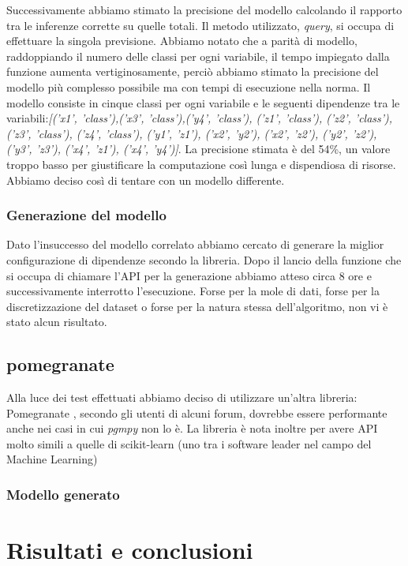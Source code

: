 \documentclass[12pt]{article}
\begin{document}
Successivamente abbiamo stimato la precisione del modello calcolando il rapporto tra le inferenze corrette su quelle totali. Il metodo utilizzato, \emph{query}, si occupa di effettuare la singola previsione. Abbiamo notato che a parità di modello, raddoppiando il numero delle classi per ogni variabile, il tempo impiegato dalla funzione aumenta vertiginosamente, perciò abbiamo stimato la precisione del modello più complesso possibile ma con tempi di esecuzione nella norma. \newline
Il modello consiste in cinque classi per ogni variabile e le seguenti dipendenze tra le variabili:\newline \emph{[('x1', 'class'),('x3', 'class'),('y4', 'class'), ('z1', 'class'), ('z2', 'class'), ('z3', 'class'), ('z4', 'class'), ('y1', 'z1'), ('x2', 'y2'), ('x2', 'z2'), ('y2', 'z2'), ('y3', 'z3'), ('x4', 'z1'),  ('x4', 'y4')]}.\newline
La precisione stimata è del 54\%, un valore troppo basso per giustificare la computazione così lunga e dispendiosa di risorse. Abbiamo deciso così di tentare con un modello differente.

\subsubsection{Generazione del modello}
Dato l'insuccesso del modello correlato abbiamo cercato di generare la miglior configurazione di dipendenze secondo la libreria. Dopo il lancio della funzione che si occupa di chiamare l'API per la generazione abbiamo atteso circa 8 ore e successivamente interrotto l'esecuzione. Forse per la mole di dati, forse per la discretizzazione del dataset o forse per la natura stessa dell'algoritmo, non vi è stato alcun risultato.

\subsection{pomegranate}
Alla luce dei test effettuati abbiamo deciso di utilizzare un'altra libreria: Pomegranate \cite{pomegranate}, secondo gli utenti di alcuni forum, dovrebbe essere performante anche nei casi in cui \emph{pgmpy} non lo è. La libreria è nota inoltre per avere API molto simili a quelle di scikit-learn \cite{scikit-learn} (uno tra i software leader nel campo del Machine Learning) 

\subsubsection{Modello generato}
\clearpage
\section{Risultati e conclusioni}

\newpage


\end{document}
